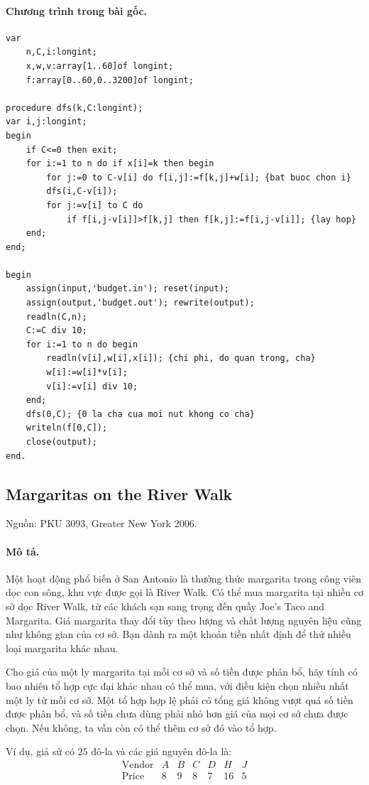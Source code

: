 \documentclass[11pt]{article}
\begin{document}
\paragraph{Chương trình trong bài gốc.}
\begin{verbatim}
var
    n,C,i:longint;
    x,w,v:array[1..60]of longint;
    f:array[0..60,0..3200]of longint;

procedure dfs(k,C:longint);
var i,j:longint;
begin
    if C<=0 then exit;
    for i:=1 to n do if x[i]=k then begin
        for j:=0 to C-v[i] do f[i,j]:=f[k,j]+w[i]; {bat buoc chon i}
        dfs(i,C-v[i]);
        for j:=v[i] to C do
            if f[i,j-v[i]]>f[k,j] then f[k,j]:=f[i,j-v[i]]; {lay hop}
    end;
end;

begin
    assign(input,'budget.in'); reset(input);
    assign(output,'budget.out'); rewrite(output);
    readln(C,n);
    C:=C div 10;
    for i:=1 to n do begin
        readln(v[i],w[i],x[i]); {chi phi, do quan trong, cha}
        w[i]:=w[i]*v[i];
        v[i]:=v[i] div 10;
    end;
    dfs(0,C); {0 la cha cua moi nut khong co cha}
    writeln(f[0,C]);
    close(output);
end.
\end{verbatim}

\subsection{Margaritas on the River Walk}

Nguồn: PKU 3093, Greater New York 2006.

\paragraph{Mô tả.}
Một hoạt động phổ biến ở San Antonio là thưởng thức margarita trong công viên
dọc con sông, khu vực được gọi là River Walk. Có thể mua margarita tại nhiều
cơ sở dọc River Walk, từ các khách sạn sang trọng đến quầy Joe's Taco and
Margarita. Giá margarita thay đổi tùy theo lượng và chất lượng nguyên liệu
cũng như không gian của cơ sở. Bạn dành ra một khoản tiền nhất định để thử
nhiều loại margarita khác nhau.

Cho giá của một ly margarita tại mỗi cơ sở và số tiền được phân bổ, hãy tính
có bao nhiêu tổ hợp cực đại khác nhau có thể mua, với điều kiện chọn nhiều
nhất một ly từ mỗi cơ sở. Một tổ hợp hợp lệ phải có tổng giá không vượt quá số
tiền được phân bổ, và số tiền chưa dùng phải nhỏ hơn giá của mọi cơ sở chưa
được chọn. Nếu không, ta vẫn còn có thể thêm cơ sở đó vào tổ hợp.

Ví dụ, giả sử có \(25\) đô-la và các giá nguyên đô-la là:
\[
\begin{array}{c|rrrrrr}
\text{Vendor} & A & B & C & D & H & J\\
\hline
\text{Price} & 8 & 9 & 8 & 7 & 16 & 5
\end{array}
\]
\end{document}
